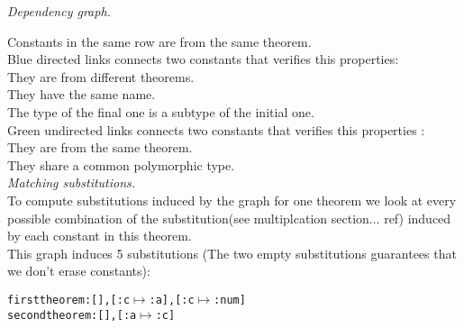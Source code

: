 \documentclass[a4paper, 11pt]{article}
\theoremstyle{plain}
\theoremstyle{definition}
\theoremstyle{remark}
\begin{document}
\vspace{5mm}
\noindent \textit{Dependency graph.}


\noindent Constants in the same row are from the same theorem.
\\ {\color{blue}Blue} directed links connects two constants that verifies this properties: 
\\They are from different theorems.
\\They have the same name.
\\The type of the final one is a subtype of the initial one. 
\\{\color{green}Green} undirected links connects two constants that verifies this properties : 
\\They are from the same theorem.
\\They share a common polymorphic type.
\vspace{5mm} \\
\noindent \textit{Matching substitutions.}
\\ To compute substitutions induced by the graph for one theorem we look at every possible combination of the substitution(see multiplcation section... ref) induced by each constant in this theorem.
\\This graph induces 5 substitutions (The two empty substitutions guarantees that we don't erase constants):
\begin{alltt}
first theorem  : [], [{:c\(\mapsto\):a}],  [{:c\(\mapsto\):num}]
second theorem : [], [{:a\(\mapsto\):c}]
\end{alltt}
\end{document}
